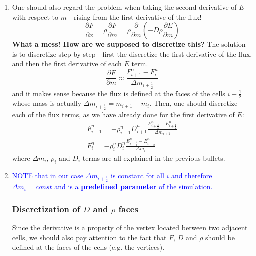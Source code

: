 \documentclass[11pt]{article}
\begin{document}
\begin{enumerate}
  \begin{equation}
    \begin{aligned}
    \Delta m_i &= m_{i+\frac{1}{2}} - m_{i-\frac{1}{2}} \\ 
    &= \left(m_{i} + \frac{1}{2} \Delta m_{i+\frac{1}{2}}\right) - \left(m_{i-1} + \frac{1}{2} \Delta m_{i-\frac{1}{2}}\right) = \frac{1}{2} \left(\Delta m_{i+\frac{1}{2}} + \Delta m_{i-\frac{1}{2}}\right)
    \end{aligned}
  \end{equation}
  \item One should also regard the problem when taking the second derivative of $E$ with respect to $m$ - rising from the first derivative of the flux!
  \begin{equation}
    \frac{\partial F}{\partial x} = \rho \frac{\partial F}{\partial m} = \rho \frac{\partial}{\partial m} \left( -D\rho \frac{\partial E}{\partial m} \right)
  \end{equation}
  \textbf{What a mess! How are we supposed to discretize this?}
  The solution is to discretize step by step - first the discretize the first derivative of the flux, and then the first derivative of each $E$ term.
  \begin{equation}
    \frac{\partial F}{\partial m} \approx \frac{F_{i+1}^{n} - F_{i}^{n}}{\Delta m_{i + \frac{1}{2}}}
  \end{equation}
  and it makes sense because the flux is defined at the faces of the cells $i+\frac{1}{2}$ whose mass is actually $\Delta m_{i+\frac{1}{2}} = m_{i+1} - m_{i}$.
  Then, one should discretize each of the flux terms, as we have already done for the first derivative of $E$:
  \begin{equation}
    \begin{gathered}
      F_{i+1}^{n} = -\rho_{i+1}^{n} D_{i+1}^{n} \frac{E_{i+\frac{3}{2}}^{n} - E_{i+\frac{1}{2}}^{n}}{\Delta m_{i+1}} \\
      F_{i}^{n} = -\rho_{i}^{n} D_{i}^{n} \frac{E_{i+\frac{1}{2}}^{n} - E_{i-\frac{1}{2}}^{n}}{\Delta m_{i}}
    \end{gathered}
  \end{equation}
  where $\Delta m_i$, $\rho_i$ and $D_i$ terms are all explained in the previous bullets.
  \item \textcolor{blue}{NOTE that in our case $\Delta m_{i+\frac{1}{2}}$ is constant for all $i$ and therefore $\Delta m_i = const$ and is a \textbf{predefined parameter} of the simulation.}
  \subsubsection{Discretization of $D$ and $\rho$ faces}
  Since the derivative is a property of the vertex located between two adjacent cells, we should also pay attention to the fact that $F$, $D$ and $\rho$ should be defined at the faces of the cells (e.g. the vertices).


\end{enumerate}
\end{document}
